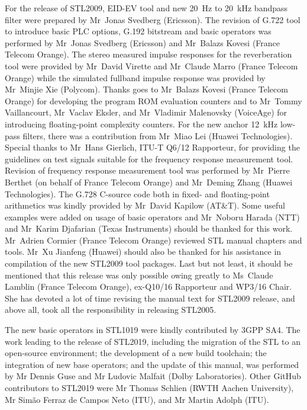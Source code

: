 For the release of STL2009, EID-EV tool and new 20~Hz to 20~kHz bandpass filter were prepared by Mr~Jonas Svedberg (Ericsson).
The revision of G.722 tool to introduce basic PLC options, G.192 bitstream and basic operators was performed by Mr~Jonas Svedberg (Ericsson) and Mr~Balazs Kovesi (France Telecom Orange).
The stereo measured impulse responses for the reverberation tool were provided by Mr~David Virette and Mr~Claude Marro (France Telecom Orange) while the simulated fullband impulse response was provided by Mr~Minjie Xie (Polycom).
Thanks goes to Mr~Balazs Kovesi (France Telecom Orange) for developing the program ROM evaluation counters and to Mr~Tommy Vaillancourt, Mr~Vaclav Eksler, and Mr~Vladimir Malenovsky (VoiceAge) for introducing floating-point complexity counters.
For the new anchor 12~kHz low-pass filters, there was a contribution from Mr~Miao Lei (Huawei Technologies).
Special thanks to Mr~Hans Gierlich, ITU-T Q6/12 Rapporteur, for providing the guidelines on test signals suitable for the frequency response measurement tool.
Revision of frequency response measurement tool was performed by Mr~Pierre Berthet (on behalf of France Telecom Orange) and Mr~Deming Zhang (Huawei Technologies).
The G.728 C-source code both in fixed- and floating-point arithmetics was kindly provided by Mr~David Kapilow (AT\&T).
Some useful examples were added on usage of basic operators and Mr~Noboru Harada (NTT) and Mr~Karim Djafarian (Texas Instruments) should be thanked for this work.
Mr~Adrien Cormier (France Telecom Orange) reviewed STL manual chapters and tools.
Mr~Xu Jianfeng (Huawei) should also be thanked for his assistance in compilation of the new STL2009 tool packages.
Last but not least, it should be mentioned that this release was only possible owing greatly to Ms~Claude Lamblin (France Telecom Orange), ex-Q10/16 Rapporteur and WP3/16 Chair.
She has devoted a lot of time revising the manual text for STL2009 release, and above all, took all the responsibility in releasing STL2005.

The new basic operators in STL1019 were kindly contributed by 3GPP SA4.
The work leading to the release of STL2019, including the migration of the STL to an open-source environment; the development of a new build toolchain; the integration of new base operators; and the update of this manual, was performed by Mr Dennis Guse and Mr Ludovic Malfait (Dolby Laboratories).
Other GitHub contributors to STL2019 were Mr Thomas Schlien (RWTH Aachen University), Mr Sim\~ao Ferraz de Campos Neto (ITU), and Mr Martin Adolph (ITU).

